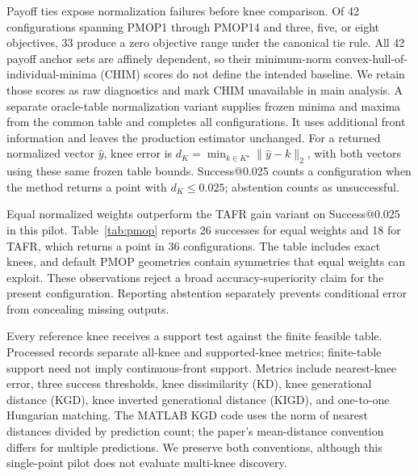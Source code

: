 \documentclass[11pt]{article}
\begin{document}
Payoff ties expose normalization failures before knee comparison.
Of 42 configurations spanning PMOP1 through PMOP14 and three, five, or eight objectives, 33 produce a zero objective range under the canonical tie rule.
All 42 payoff anchor sets are affinely dependent, so their minimum-norm convex-hull-of-individual-minima (CHIM) scores do not define the intended baseline.
We retain those scores as raw diagnostics and mark CHIM unavailable in main analysis.
A separate oracle-table normalization variant supplies frozen minima and maxima from the common table and completes all configurations.
It uses additional front information and leaves the production estimator unchanged.
For a returned normalized vector $\hat y$, knee error is $d_K=\min_{k\in K^\star}\|\hat y-k\|_2$, with both vectors using these same frozen table bounds.
Success@0.025 counts a configuration when the method returns a point with $d_K\le0.025$; abstention counts as unsuccessful.
\begin{table}[htbp]\centering\small
\caption{One-seed PMOP pilot with 17 candidate weights. Error quantiles condition on a returned point; success denominators include all 42 configurations.}\label{tab:pmop}\end{table}

Equal normalized weights outperform the TAFR gain variant on Success@0.025 in this pilot.
Table~\ref{tab:pmop} reports 26 successes for equal weights and 18 for TAFR, which returns a point in 36 configurations.
The table includes exact knees, and default PMOP geometries contain symmetries that equal weights can exploit.
These observations reject a broad accuracy-superiority claim for the present configuration.
Reporting abstention separately prevents conditional error from concealing missing outputs.

Every reference knee receives a support test against the finite feasible table.
Processed records separate all-knee and supported-knee metrics; finite-table support need not imply continuous-front support.
Metrics include nearest-knee error, three success thresholds, knee dissimilarity (KD), knee generational distance (KGD), knee inverted generational distance (KIGD), and one-to-one Hungarian matching.
The MATLAB KGD code uses the norm of nearest distances divided by prediction count; the paper's mean-distance convention differs for multiple predictions.
We preserve both conventions, although this single-point pilot does not evaluate multi-knee discovery.
\end{document}

